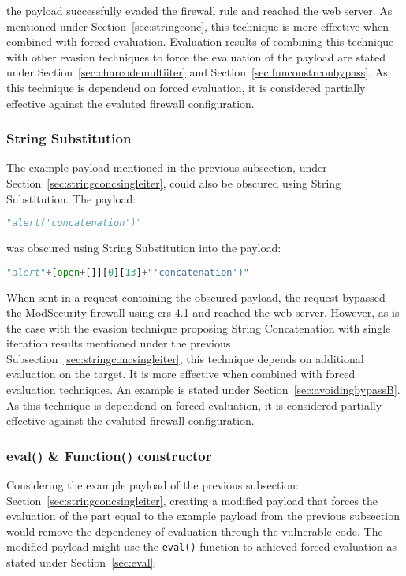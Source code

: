 the payload successfully evaded the firewall rule and reached the web server. As mentioned under Section~\ref{sec:stringconc}, this technique is more effective when combined with forced evaluation. Evaluation results of combining this technique with other evasion techniques to force the evaluation of the payload are stated under Section~\ref{sec:charcodemultiiter} and Section~\ref{sec:funconstrconbypass}. As this technique is dependend on forced evaluation, it is considered partially effective against the evaluted firewall configuration.


\subsubsection{String Substitution}
\label{sec:stringsubsingleiter}
The example payload mentioned in the previous subsection, under Section~\ref{sec:stringconcsingleiter}, could also be obscured using String Substitution. The payload:

\begin{lstlisting}[style=basicStyle, language=Python]
"alert('concatenation')"
\end{lstlisting}

was obscured using String Substitution into the payload:

\begin{lstlisting}[style=basicStyle, language=Python]
"alert"+[open+[]][0][13]+"'concatenation')"
\end{lstlisting}

When sent in a request containing the obscured payload, the request bypassed the ModSecurity firewall using \acrshort{crs} 4.1 and reached the web server. However, as is the case with the evasion technique proposing String Concatenation with single iteration results mentioned under the previous Subsection~\ref{sec:stringconcsingleiter}, this technique depends on additional evaluation on the target. 
It is more effective when combined with forced evaluation techniques. An example is stated under Section~\ref{sec:avoidingbypassB}. 
As this technique is dependend on forced evaluation, it is considered partially effective against the evaluted firewall configuration.


\subsubsection{eval() \& Function() constructor}
\label{sec:functionconstructorsingleeva}
Considering the example payload of the previous subsection: Section~\ref{sec:stringconcsingleiter}, creating a modified payload that forces the evaluation of the part equal to the example payload from the previous subsection would remove the dependency of evaluation through the vulnerable code. The modified payload might use the \verb|eval()| function to achieved forced evaluation as stated under Section~\ref{sec:eval}:

